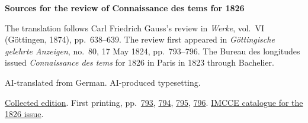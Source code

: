 \clearpage\thispagestyle{empty}
\begin{center}\Large\bfseries Sources for the review of Connaissance des tems for 1826\end{center}

The translation follows Carl Friedrich Gauss’s review in \emph{Werke}, vol.~VI (Göttingen, 1874), pp.~638--639. The review first appeared in \emph{Göttingische gelehrte Anzeigen}, no.~80, 17 May 1824, pp.~793--796. The Bureau des longitudes issued \emph{Connaissance des tems} for 1826 in Paris in 1823 through Bachelier.

AI-translated from German. AI-produced typesetting.

\href{https://gdz.sub.uni-goettingen.de/id/PPN236007467}{Collected edition}. First printing, pp.~\href{https://images.p.sub.uni-goettingen.de/iiif/image/gdz:PPN385030444_1824_2:00000107/full/1650,/0/default.jpg}{793}, \href{https://images.p.sub.uni-goettingen.de/iiif/image/gdz:PPN385030444_1824_2:00000108/full/1650,/0/default.jpg}{794}, \href{https://images.p.sub.uni-goettingen.de/iiif/image/gdz:PPN385030444_1824_2:00000109/full/1650,/0/default.jpg}{795}, \href{https://images.p.sub.uni-goettingen.de/iiif/image/gdz:PPN385030444_1824_2:00000110/full/1650,/0/default.jpg}{796}. \href{https://cdt.imcce.fr/items/show/175}{IMCCE catalogue for the 1826 issue}.

\clearpage
